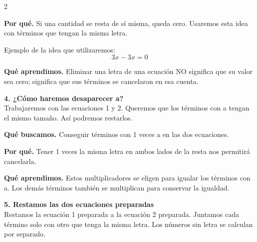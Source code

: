 \documentclass[11pt,a4paper,landscape]{article}
\begin{document}
\begin{multicols*}{2}
\begin{minipage}{\linewidth}
\par\smallskip\textbf{Por qué.} Si una cantidad se resta de sí misma, queda cero. Usaremos esta idea con términos que tengan la misma letra.
\par\smallskip Ejemplo de la idea que utilizaremos:
\[3x-3x=0\]
\par\smallskip\textbf{Qué aprendimos.} Eliminar una letra de una ecuación NO significa que su valor sea cero; significa que sus términos se cancelaron en esa cuenta.
\end{minipage}\par\medskip
\noindent\begin{minipage}{\linewidth}\textbf{4. ¿Cómo haremos desaparecer a?}\\[2pt]Trabajaremos con las ecuaciones 1 y 2. Queremos que los términos con a tengan el mismo tamaño. Así podremos restarlos.
\par\smallskip\textbf{Qué buscamos.} Conseguir términos con 1 veces a en las dos ecuaciones.
\par\smallskip\textbf{Por qué.} Tener 1 veces la misma letra en ambos lados de la resta nos permitirá cancelarla.
\par{}\par\smallskip
\par\smallskip\textbf{Qué aprendimos.} Estos multiplicadores se eligen para igualar los términos con a. Los demás términos también se multiplican para conservar la igualdad.
\end{minipage}\par\medskip
\noindent\begin{minipage}{\linewidth}\textbf{5. Restamos las dos ecuaciones preparadas}\\[2pt]Restamos la ecuación 1 preparada a la ecuación 2 preparada. Juntamos cada término solo con otro que tenga la misma letra. Los números sin letra se calculan por separado.

\end{minipage}
\end{multicols*}
\end{document}

